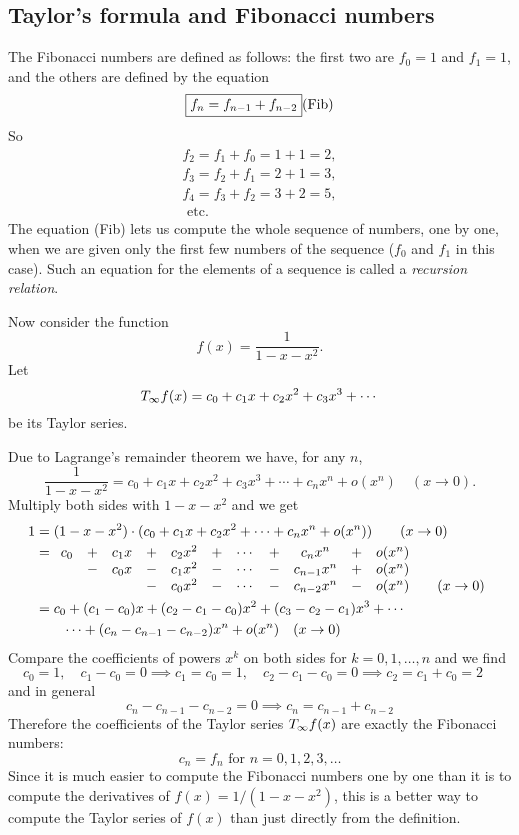\subsection{Taylor's formula and Fibonacci numbers} %
\label{ex:fibonacci-1}%
The Fibonacci numbers are defined as follows: the
first two are $f_0=1$ and $f_1=1$, and the others are defined by the
equation
\[
\text{\fbox{$f_{n}=f_{n-1}+f_{n-2}$}} \relax{\text{(Fib)}}
\]
So
\begin{gather*}
  f_2=f_1+f_0=1+1=2,\\
  f_3=f_2+f_1=2+1=3,\\
  f_4=f_3+f_2=3+2=5,\\ \text{ etc.}
\end{gather*}
The equation (Fib) lets us  compute the whole sequence of numbers, one by
one, when we  are given only the first few numbers of the sequence ($f_0$
and $f_1$ in this case). Such an equation for the elements of a sequence is
called a \emph{recursion relation}.

Now consider the function
\[
f(x) = \frac{1}{1-x-x^2}.
\]
Let
\[
T_{\infty} f(x) = c_0+c_1x+c_2x^2+c_3x^3+\cdots
\]
be its Taylor series.

Due to Lagrange's remainder theorem we  have, for any $n$,
\[
\frac{1}{1-x-x^2} = c_0+c_1x+c_2x^2+c_3x^3+\cdots+c_nx^n+o(x^n)\quad
(x\to0).
\]
Multiply both sides with $1-x-x^2$ and we  get
\begin{align*}
  1&= (1-x-x^2)\cdot ( c_0+c_1x+c_2x^2+\cdots+c_nx^n+o(x^n)) \qquad (x\to0) \\
  &=\begin{array}[t]{cccccccccccc}
    c_0&+&c_1x&+&c_2x^2&+&\cdots&+&c_nx^n    &+&o(x^n)& \\
    &-&c_0x&-&c_1x^2&-&\cdots&-&c_{n-1}x^n&+&o(x^n)&  \\
    & & &-&c_0x^2&-&\cdots&-&c_{n-2}x^n&-&o(x^n)& \quad (x\to0)
  \end{array} \\
  &= c_0 + (c_1-c_0)x + (c_2-c_1-c_0)x^2 + (c_3-c_2-c_1)x^3 +\cdots \\
  &\qquad\cdots + (c_n-c_{n-1}-c_{n-2})x^n + o(x^n)\quad (x\to 0)
\end{align*}
Compare the coefficients of powers $x^k$ on both sides for $k=0,1,\ldots,n$
and we  find
\[
c_0=1, \quad c_1-c_0 = 0 \implies c_1=c_0=1,\quad c_2-c_1-c_0=0 \implies
c_2= c_1+c_0 =2 \quad
\]
and in general
\[
c_n-c_{n-1}-c_{n-2} = 0 \implies c_n = c_{n-1}+c_{n-2}
\]
Therefore the coefficients of the Taylor series $T_{\infty} f(x)$ are exactly the
Fibonacci numbers:
\[ c_n=f_n \text{ for }n=0,1,2,3,\ldots \] Since it is much easier to
compute the Fibonacci numbers one by one than it is to compute the
derivatives of $f(x)=1/ (1-x-x^2)$, this is a better way to compute the
Taylor series of $f(x)$ than just directly from the definition.


